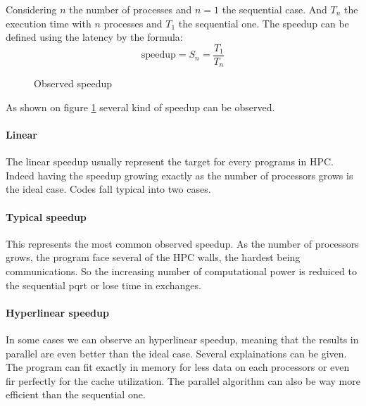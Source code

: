 Considering $n$ the number of processes and $n=1$ the sequential case.
And $T_n$ the execution time with $n$ processes and $T_1$ the sequential one. 
The speedup can be defined using the latency by the formula: 
\begin{equation}
\text{speedup} = S_n =  \frac{T_1}{T_n}
\end{equation}


\begin{figure}
\centering 
{}
\caption{Observed speedup}
\label{fig:1_HPC:speedup_obs}
\end{figure}

As shown on figure \ref{fig:1_HPC:speedup_obs} several kind of speedup can be observed. 
\paragraph{Linear}
The linear speedup usually represent the target for every programs in HPC. 
Indeed having the speedup growing exactly as the number of processors grows is the ideal case. 
Codes fall typical into two cases. 
\paragraph{Typical speedup}
This represents the most common observed speedup. 
As the number of processors grows, the program face several of the HPC walls, the hardest being communications.
So the increasing number of computational power is reduiced to the sequential pqrt or lose time in exchanges. 
\paragraph{Hyperlinear speedup}
In some cases we can observe an hyperlinear speedup, meaning that the results in parallel are even better than the ideal case. 
Several explainations can be given. 
The program can fit exactly in memory for less data on each processors or even fir perfectly for the cache utilization. 
The parallel algorithm can also be way more efficient than the sequential one. 

